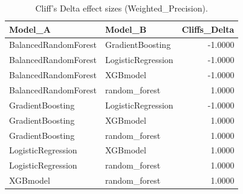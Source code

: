 \begin{table}[t]
\centering
\begin{tabular}{llr}
\toprule
Model_A & Model_B & Cliffs_Delta \\
\midrule
BalancedRandomForest & GradientBoosting & -1.0000 \\
BalancedRandomForest & LogisticRegression & -1.0000 \\
BalancedRandomForest & XGBmodel & -1.0000 \\
BalancedRandomForest & random_forest & 1.0000 \\
GradientBoosting & LogisticRegression & -1.0000 \\
GradientBoosting & XGBmodel & 1.0000 \\
GradientBoosting & random_forest & 1.0000 \\
LogisticRegression & XGBmodel & 1.0000 \\
LogisticRegression & random_forest & 1.0000 \\
XGBmodel & random_forest & 1.0000 \\
\bottomrule
\end{tabular}
\caption{Cliff's Delta effect sizes (Weighted_Precision).}
\label{tab:cliffs_Weighted_Precision}
\end{table}